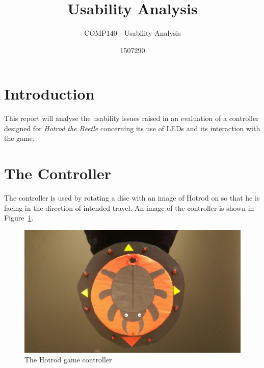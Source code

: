 \documentclass{scrartcl}
\title{Usability Analysis}
\subtitle{COMP140 - Usability Analysis}
\author{1507290}
\begin{document}
\maketitle

\abstract{}



\section{Introduction}

This report will analyse the usability issues raised in an evaluation of a controller designed for \textit{Hotrod the Beetle} concerning its use of LEDs and its interaction with the game.

\section{The Controller}
The controller is used by rotating a disc with an image of Hotrod on so that he is facing in the direction of intended travel. An image of the controller is shown in Figure~\ref{fig:controller}.
\begin{figure}
\includegraphics[width=\textwidth]{controller.jpg}
\caption{The Hotrod game controller}
\label{fig:controller}
\end{figure} 
\end{document}
